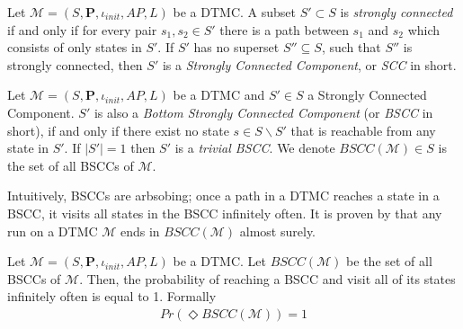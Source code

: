 \begin{definition}
      \rm
      Let $\mathcal{M}=(S,\mathbf{P}, \iota_{init}, AP,L)$ be a DTMC. A subset $S'\subset S$ is
      \textit{strongly connected} if and only if for every pair $s_1,s_2\in S'$ there is a path
      between $s_1$ and $s_2$ which consists of only states in $S'$. If $S'$ has no superset
      $S''\subseteq S$, such that $S''$ is strongly connected, then $S'$ is a \textit{Strongly
            Connected Component}, or \textit{SCC} in short.
\end{definition}

\begin{definition}
      \rm
      Let $\mathcal{M}=(S,\mathbf{P}, \iota_{init}, AP,L)$ be a DTMC and $S'\in S$ a Strongly
      Connected Component. $S'$ is also a \textit{Bottom Strongly Connected Component} (or
      \textit{BSCC} in short), if and only if there exist no state $s \in S\backslash S'$ that is reachable
      from any state in $S'$. If $|S'|=1$ then $S'$ is a \textit{trivial BSCC}. We denote
      $BSCC(\mathcal{M})\in S$ is the set of all BSCCs of $\mathcal{M}$.
\end{definition}

\noindent Intuitively, BSCCs are arbsobing; once a path in a DTMC reaches a state in a BSCC, it visits  all
states in the BSCC infinitely often. It is proven by \cite{baier2008principles} that any run on a
DTMC $\mathcal{M}$ ends in $BSCC(\mathcal{M})$ almost surely.
\begin{theorem}
      \rm
      Let $\mathcal{M}=(S,\mathbf{P}, \iota_{init}, AP,L)$ be a DTMC. Let $BSCC(\mathcal{M})$ be the
      set of all BSCCs of $\mathcal{M}$. Then, the probability of reaching a BSCC and visit all of
      its states infinitely often is equal to 1. Formally
      \begin{align*}
            Pr(\Diamond BSCC(\mathcal{M})) = 1
      \end{align*}
\end{theorem}

